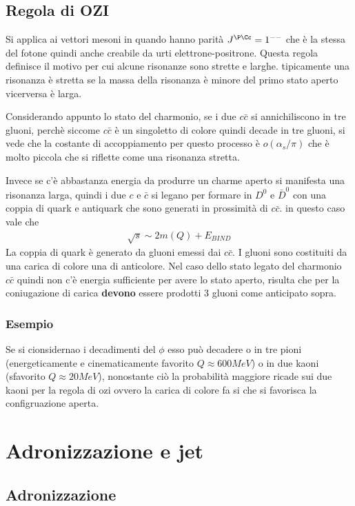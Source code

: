 \documentclass[12pt]{book}
\begin{document}
\subsection{Regola di OZI}
Si applica ai vettori mesoni in quando hanno parità $J^{\P \Cc}=1^{--}$ che è la stessa del fotone quindi anche creabile da urti elettrone-positrone. Questa regola definisce il motivo per cui alcune risonanze sono strette e larghe. tipicamente una risonanza è stretta se la massa della risonanza è minore del primo stato aperto vicerversa è larga.

Considerando appunto lo stato del charmonio, se i due $c \bar c$ si annichiliscono in tre gluoni, perchè siccome $c \bar c$ è un singoletto di colore quindi decade in tre gluoni, si vede che la costante di accoppiamento per questo processo è $o (\alpha_s / \pi) $ che è molto piccola che si riflette come una risonanza stretta.

Invece se c'è abbastanza energia da produrre un charme aperto si manifesta una risonanza larga, quindi i due $c$ e $\bar c$ si legano per formare in $D^0$ e $\bar D^0$ con una coppia di quark e antiquark che sono generati in prossimità di $c \bar c$. in questo caso vale che 
\begin{gather}
	\sqrt{s} \sim 2 m (Q) + E_{BIND}
\end{gather}
La coppia di quark è generato da gluoni emessi dai $c \bar c$. I gluoni sono costituiti da una carica di colore una di anticolore. Nel caso dello stato legato del charmonio $c \bar c$ quindi non c'è energia sufficiente per avere lo stato aperto, risulta che per la coniugazione di carica \textbf{devono} essere prodotti 3 gluoni come anticipato sopra. 

\subsubsection{Esempio}
Se si cionsidernao i decadimenti del $\phi$ esso può decadere o in tre pioni (energeticamente e cinematicamente favorito $Q\approx 600MeV$) o in due kaoni (sfavorito $Q \approx 20 MeV$), nonostante ciò la probabilità maggiore ricade sui due kaoni per la regola di ozi ovvero la carica di colore fa si che si favorisca la configruazione aperta.

\section{Adronizzazione e jet}
\subsection{Adronizzazione}
\end{document}
